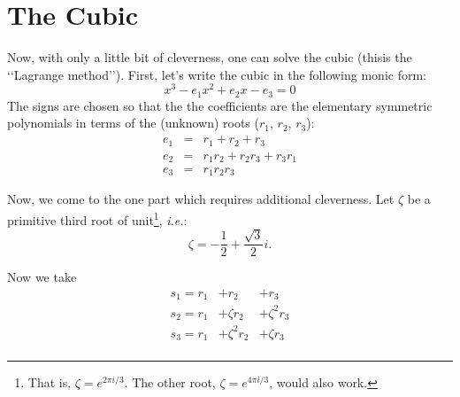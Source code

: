 \documentclass{article}
\begin{document}
\section{The Cubic}
Now, with only a little bit of cleverness, one can solve the
cubic (thisis the \lq\lq Lagrange method\rq\rq{}).
First, let's write the cubic in the following monic form:
\begin{equation}
  x^3 - e_1 x^2 + e_2 x - e_3 = 0
\end{equation}
The signs are chosen so that the the coefficients are the
elementary symmetric polynomials in terms of the 
(unknown) roots ($r_1$, $r_2$, $r_3$):
\begin{eqnarray}
 e_1 & = & r_1 + r_2 + r_3 \\
 e_2 & = & r_1 r_2 + r_2 r_3 + r_3 r_1 \\
 e_3 & = & r_1 r_2 r_3 
\end{eqnarray}

Now, we come to the one part which requires additional cleverness.
Let $\zeta$ be a primitive third root of unit\footnote{That is,
$\zeta = e^{2\pi i/3}$.  The other root, 
$\zeta = e^{4\pi i/3}$, would also work.}, \emph{i.e.}:
\begin{equation}
 \zeta = -\frac{1}{2} + \frac{\sqrt{3}}{2}i.
\end{equation}

Now we take 
\begin{eqnarray}
s_1  =  r_1  & + r_2 & +  r_3 \label{eq:cube-lin1}\\
s_2  =  r_1  &  + \zeta r_2 & +  \zeta^2 r_3 \label{eq:cube-lin2} \\
s_3  =  r_1  & + \zeta^2 r_2 & +  \zeta r_3 \label{eq:cube-lin3} \\
\end{eqnarray}
\end{document}
